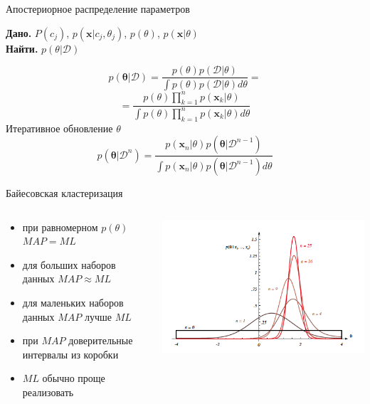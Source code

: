 \documentclass[10pt]{beamer}
\begin{document}
\begin{frame}{Апостериорное распределение параметров}

{\bf Дано.} \underline{$P(c_j)$}, \underline{$p(\mathbf{x} | c_j, \theta_j)$}, \underline{$p(\theta)$}, \underline{$p(\mathbf{x} | \theta)$} \\
{\bf Найти.} $p(\theta | \mathcal{D})$

\[
p(\mathbf{\theta} | \mathcal{D}) = \frac{p(\theta) p(\mathcal{D} | \theta)}{\int p(\theta) p(\mathcal{D} | \theta) d \theta} =
\]
\[
= \frac{p(\theta) \prod_{k=1}^n p(\mathbf{x}_k | \theta)}{\int p(\theta) \prod_{k=1}^n p(\mathbf{x}_k | \theta) d \theta}
\]
Итеративное обновление $\theta$
\[
p(\mathbf{\theta} | \mathcal{D}^n) = \frac{p(\mathbf{x}_n | \theta) p(\mathbf{\theta} | \mathcal{D}^{n-1})}{\int p(\mathbf{x}_n | \theta) p(\mathbf{\theta} | \mathcal{D}^{n-1}) d \theta}
\]

\end{frame}

\begin{frame}{Байесовская кластеризация}

\begin{columns}[C]
    \begin{column}{.5\textwidth}
    	\begin{itemize}
		\item при равномерном $p(\theta)$ $MAP = ML$
		\item для больших наборов данных $MAP \approx ML$
		\item для маленьких наборов данных $MAP$ лучше $ML$
		\item при $MAP$ доверительные интервалы из коробки
		\item $ML$ обычно проще реализовать
		\end{itemize}
    \end{column}
    \begin{column}{.5\textwidth}
    \vspace{-0em}
	\begin{center}
   		\includegraphics[width=\textwidth]{images/map.png}
    \end{center}
    \end{column}
  \end{columns}

\end{frame}
\end{document}
